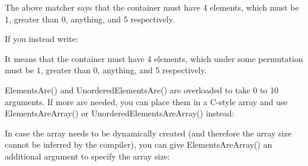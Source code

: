 \begin{DoxyCode}{0}
\DoxyCodeLine{}
\DoxyCodeLine{}
\end{DoxyCode}


The above matcher says that the container must have 4 elements, which must be 1, greater than 0, anything, and 5 respectively.

If you instead write\+:


\begin{DoxyCode}{0}
\DoxyCodeLine{}
\DoxyCodeLine{}
\end{DoxyCode}


It means that the container must have 4 elements, which under some permutation must be 1, greater than 0, anything, and 5 respectively.

{\ttfamily Elements\+Are()} and {\ttfamily Unordered\+Elements\+Are()} are overloaded to take 0 to 10 arguments. If more are needed, you can place them in a C-\/style array and use {\ttfamily Elements\+Are\+Array()} or {\ttfamily Unordered\+Elements\+Are\+Array()} instead\+:


\begin{DoxyCode}{0}
\DoxyCodeLine{}
\DoxyCodeLine{}
\end{DoxyCode}


In case the array needs to be dynamically created (and therefore the array size cannot be inferred by the compiler), you can give {\ttfamily Elements\+Are\+Array()} an additional argument to specify the array size\+:


